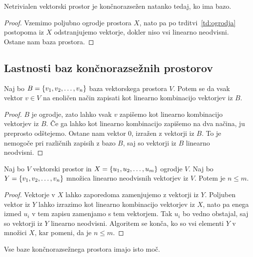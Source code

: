 \documentclass[12pt, a4paper]{article}
\begin{document}
\begin{izrek}
Netrivialen vektorski prostor je končnorazsežen natanko tedaj, ko ima bazo.
\end{izrek}

\begin{proof}
Vzemimo poljubno ogrodje prostora $X$, nato pa po trditvi~\ref{td:ogrodja} postopoma iz $X$ odstranjujemo vektorje, dokler niso vsi linearno neodvisni. Ostane nam baza prostora.
\end{proof}

\newpage

\subsection{Lastnosti baz končnorazsežnih prostorov}

\begin{trditev}
Naj bo $B=\left\{v_1,v_2,\dots,v_n\right\}$ baza vektorskega prostora $V$. Potem se da vsak vektor $v\in V$ na enoličen način zapisati kot linearno kombinacijo vektorjev iz $B$.
\end{trditev}

\begin{proof}
$B$ je ogrodje, zato lahko vsak $v$ zapišemo kot linearno kombinacijo vektorjev iz $B$. Če ga lahko kot linearno kombinacijo zapišemo na dva načina, ju preprosto odštejemo. Ostane nam vektor $0$, izražen z vektorji iz $B$. To je nemogoče pri različnih zapisih z bazo $B$, saj so vektorji iz $B$ linearno neodvisni.
\end{proof}

\begin{lema}\label{lm:ineq}
Naj bo $V$ vektorski prostor in $X=\left\{u_1,u_2,\dots,u_m\right\}$ ogrodje $V$. Naj bo $Y=\left\{v_1,v_2,\dots,v_n\right\}$ množica linearno neodvisnih vektorjev iz $V$. Potem je $n\leq m$.
\end{lema}

\begin{proof}
Vektorje v $X$ lahko zaporedoma zamenjujemo z vektorji iz $Y$. Poljuben vektor iz $Y$ lahko izrazimo kot linearno kombinacijo vektorjev iz $X$, nato pa enega izmed $u_i$ v tem zapisu zamenjamo s tem vektorjem. Tak $u_i$ bo vedno obstajal, saj so vektorji iz $Y$ linearno neodvisni. Algoritem se konča, ko so vsi elementi $Y$ v množici $X$, kar pomeni, da je $n\leq m$.
\end{proof}

\begin{posledica}
Vse baze končnorazsežnega prostora imajo isto moč.
\end{posledica}
\end{document}
